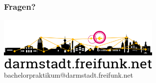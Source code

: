 \documentclass[accentcolor=tud6b,colorbacktitle,inverttitle,landscape,german,presentation,t]{tudbeamer}
\begin{document}
	\begin{frame}
		\frametitle{Fragen?}
			\begin{center}
				\vspace{1cm}
				\includegraphics[width=0.6\textwidth]{images/logo-skyline-text-below}
				\vspace{0.6cm}
				bachelorpraktikum@darmstadt.freifunk.net
			\end{center}
		    \vfill
		    
		    
	\end{frame}
\end{document}
